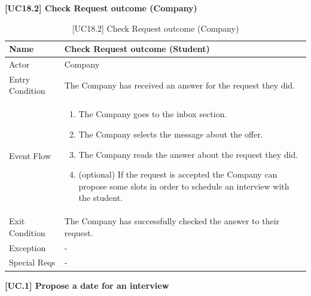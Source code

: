 \textbf{[UC18.2] Check Request outcome (Company)}
\begin{table}[H] %
    \centering
    \begin{tabular}{|p{3cm}|p{10cm}|}
    \hline
    Name & Check Request outcome (Student)\\ \hline
    Actor  & Company \\ \hline
    Entry Condition  & The Company has received an answer for the request they did.  \\ \hline
    Event Flow  & 
    \begin{enumerate}[noitemsep, topsep=0pt]
        \item The Company goes to the inbox section.
        \item The Company selects the message about the offer.
        \item The Company reads the answer about the request they did.
        \item (optional) If the request is accepted the Company can propose some slots in order to schedule an interview with the student.
    \end{enumerate}
    \\ \hline
    Exit Condition  & The Company has successfully checked the answer to their request. \\ \hline
    Exception  & - \\ \hline
    Special Reqs  & - \\ \hline
    \end{tabular}
    \caption{[UC18.2] Check Request outcome (Company)}
\end{table}
\textbf{[UC\nextUseCases.1] Propose a date for an interview}
